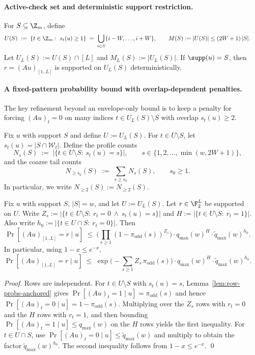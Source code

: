\paragraph{Active-check set and deterministic support restriction.}
For $S\subseteq\Z_m$, define
\[
U(S)\;:=\;\{t\in\Z_m:\ s_t(u)\ge 1\}
\;=\;
\bigcup_{i\in S}\{i-W,\dots,i+W\},
\qquad
M(S):=|U(S)|\le (2W+1)\,|S|.
\]
Let $U_L(S):=U(S)\cap [L]$ and $M_L(S):=|U_L(S)|$.
If $\supp(u)=S$, then $r=(Au)_{[1..L]}$ is supported on $U_L(S)$ deterministically.

\paragraph{A fixed-pattern probability bound with overlap-dependent penalties.}
The key refinement beyond an envelope-only bound is to keep a penalty for forcing $(Au)_t=0$ on many indices
$t\in U_L(S)\setminus S$ with overlap $s_t(u)\ge 2$.

\begin{definition}
\label{def:overlap-profile}
Fix $u$ with support $S$ and define $U:=U_L(S)$.
For $t\in U\setminus S$, let $s_t(u)=|S\cap \mathcal W_t|$.
Define the profile counts
\[
N_s(S)\;:=\;|\{t\in U\setminus S:\ s_t(u)=s\}|,
\qquad s\in\{1,2,\dots,\min(w,2W+1)\},
\]
and the coarse tail counts
\[
N_{\ge s_0}(S)\;:=\;\sum_{s\ge s_0} N_s(S),
\qquad s_0\ge 1.
\]
In particular, we write $N_{\ge 2}(S):=N_{\ge 2}(S)$.
\end{definition}

\begin{lemma}
\label{lem:fixed-r-pattern-overlap}
Fix $u$ with support $S$, $|S|=w$, and let $U:=U_L(S)$.
Let $r\in\F_2^L$ be supported on $U$.
Write $Z_s:=|\{t\in U\setminus S:\ r_t=0\ \wedge\ s_t(u)=s\}|$ and $H:=|\{t\in U\setminus S:\ r_t=1\}|$.
Also write $h_0:=|\{t\in U\cap S:\ r_t=0\}|$.
Then
\[
\Pr[(Au)_{[1..L]}=r\mid u]
\;\le\;
\Big(\prod_{s\ge 1} (1-\pi_{\mathrm{odd}}(s))^{Z_s}\Big)\cdot q_{\max}(w)^{H}\cdot \widetilde q_{\max}(w)^{h_0}.
\]
In particular, using $1-x\le e^{-x}$,
\[
\Pr[(Au)_{[1..L]}=r\mid u]
\;\le\;
\exp\!\Big(-\sum_{s\ge 1} Z_s\,\pi_{\mathrm{odd}}(s)\Big)\cdot q_{\max}(w)^{H}\cdot \widetilde q_{\max}(w)^{h_0}.
\]
\end{lemma}

\begin{proof}
Rows are independent.
For $t\in U\setminus S$ with $s_t(u)=s$, Lemma~\ref{lem:row-probs-anchored} gives
$\Pr[(Au)_t=1\mid u]=\pi_{\mathrm{odd}}(s)$ and hence $\Pr[(Au)_t=0\mid u]=1-\pi_{\mathrm{odd}}(s)$.
Multiplying over the $Z_s$ rows with $r_t=0$ and the $H$ rows with $r_t=1$, and then bounding
$\Pr[(Au)_t=1\mid u]\le q_{\max}(w)$ on the $H$ rows yields the first inequality.
For $t\in U\cap S$, use $\Pr[(Au)_t=0\mid u]\le \widetilde q_{\max}(w)$ and multiply to obtain the factor
$\widetilde q_{\max}(w)^{h_0}$.
The second inequality follows from $1-x\le e^{-x}$.
\qed
\end{proof}

